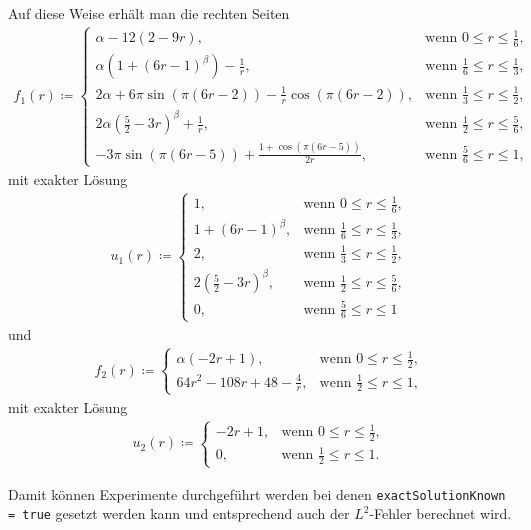 Auf diese Weise erhält man die rechten Seiten
\begin{align*}
  f_1(r)\coloneqq 
  \begin{cases}
    \alpha-12(2-9r), & \text{wenn } 0\leq r\leq\frac{1}{6},\\
    \alpha(1+(6r-1)^\beta)-\frac{1}{r}, & \text{wenn } \frac{1}{6}\leq r\leq
    \frac{1}{3},\\
    2\alpha+6\pi\sin(\pi(6r-2))-\frac{1}{r}\cos(\pi(6r-2)), &
    \text{wenn } \frac{1}{3}\leq r\leq\frac{1}{2},\\
    2\alpha(\frac{5}{2}-3r)^\beta+\frac{1}{r},&
    \text{wenn } \frac{1}{2}\leq r\leq\frac{5}{6},\\
    -3\pi\sin(\pi(6r-5))+\frac{1+\cos(\pi(6r-5))}{2r}, &
    \text{wenn } \frac{5}{6}\leq r\leq 1,
  \end{cases}
\end{align*}
mit exakter Lösung
\begin{align*}
  u_1(r)\coloneqq
  \begin{cases}
    1, & \text{wenn } 0\leq r\leq\frac{1}{6},\\
    1+(6r-1)^\beta, & \text{wenn } \frac{1}{6}\leq r\leq
    \frac{1}{3},\\
    2, &
    \text{wenn } \frac{1}{3}\leq r\leq\frac{1}{2},\\
    2(\frac{5}{2}-3r)^\beta, &
    \text{wenn } \frac{1}{2}\leq r\leq\frac{5}{6},\\
    0, &
    \text{wenn } \frac{5}{6}\leq r\leq 1
  \end{cases}
\end{align*}
und
\begin{align*}
  f_2(r)\coloneqq 
  \begin{cases}
    \alpha(-2r+1), & \text{wenn } 0\leq r\leq\frac{1}{2},\\
    64r^2-108r+48-\frac{4}{r}, & \text{wenn } \frac{1}{2}\leq r\leq 1,
  \end{cases}
\end{align*}
mit exakter Lösung
\begin{align*}
  u_2(r)\coloneqq 
  \begin{cases}
    -2r+1, & \text{wenn } 0\leq r\leq\frac{1}{2},\\
    0, & \text{wenn } \frac{1}{2}\leq r\leq 1.
  \end{cases}
\end{align*}

Damit können Experimente durchgeführt werden bei denen 
\texttt{exactSolutionKnown = true} gesetzt werden kann und entsprechend auch 
der $L^2$-Fehler berechnet wird.

